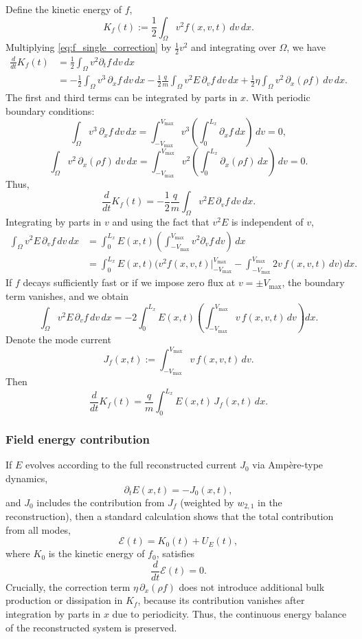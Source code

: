 \documentclass[11pt]{article}
\begin{document}
Define the kinetic energy of $f$,
\[
  K_f(t) := \frac12 \int_{\Omega} v^2 f(x,v,t)\,dv\,dx.
\]
Multiplying \eqref{eq:f_single_correction} by $\frac12 v^2$ and integrating
over $\Omega$, we have
\begin{align*}
  \frac{d}{dt} K_f(t)
  &= \frac12 \int_{\Omega} v^2 \partial_t f\,dv\,dx \\
  &= -\frac12 \int_{\Omega} v^3\,\partial_x f\,dv\,dx
     -\frac12 \frac{q}{m} \int_{\Omega} v^2 E\,\partial_v f\,dv\,dx
     +\frac12 \eta \int_{\Omega} v^2\,\partial_x(\rho f)\,dv\,dx.
\end{align*}
The first and third terms can be integrated by parts in $x$. With periodic
boundary conditions:
\[
  \int_{\Omega} v^3\,\partial_x f\,dv\,dx
  = \int_{-V_{\max}}^{V_{\max}} v^3 
    \left( \int_0^{L_x} \partial_x f\,dx \right)\,dv = 0,
\]
\[
  \int_{\Omega} v^2\,\partial_x(\rho f)\,dv\,dx
  = \int_{-V_{\max}}^{V_{\max}} v^2
    \left( \int_0^{L_x} \partial_x(\rho f)\,dx \right)\,dv = 0.
\]
Thus,
\[
  \frac{d}{dt} K_f(t)
  = -\frac12 \frac{q}{m} \int_{\Omega} v^2 E\,\partial_v f\,dv\,dx.
\]
Integrating by parts in $v$ and using the fact that $v^2 E$ is independent of
$v$,
\begin{align*}
  \int_{\Omega} v^2 E\,\partial_v f\,dv\,dx
  &= \int_0^{L_x} E(x,t)
     \left(\int_{-V_{\max}}^{V_{\max}} v^2 \partial_v f\,dv \right)\,dx \\
  &= \int_0^{L_x} E(x,t)
     \Big( v^2 f(x,v,t) \big|_{-V_{\max}}^{V_{\max}}
           - \int_{-V_{\max}}^{V_{\max}} 2v\,f(x,v,t)\,dv
     \Big)\,dx.
\end{align*}
If $f$ decays sufficiently fast or if we impose zero flux at $v=\pm V_{\max}$,
the boundary term vanishes, and we obtain
\[
  \int_{\Omega} v^2 E\,\partial_v f\,dv\,dx
  = -2 \int_0^{L_x} E(x,t)
                  \left(\int_{-V_{\max}}^{V_{\max}} v\,f(x,v,t)\,dv\right)dx.
\]
Denote the mode current
\[
  J_f(x,t) := \int_{-V_{\max}}^{V_{\max}} v\,f(x,v,t)\,dv.
\]
Then
\[
  \frac{d}{dt} K_f(t)
  = \frac{q}{m} \int_0^{L_x} E(x,t)\,J_f(x,t)\,dx.
\]

\subsubsection{Field energy contribution}

If $E$ evolves according to the full reconstructed current $J_0$ via
Amp\`ere-type dynamics,
\[
  \partial_t E(x,t) = - J_0(x,t),
\]
and $J_0$ includes the contribution from $J_f$ (weighted by $w_{2,1}$ in the
reconstruction), then a standard calculation shows that the total contribution
from all modes,
\[
  \mathcal{E}(t) = K_0(t) + U_E(t),
\]
where $K_0$ is the kinetic energy of $f_0$, satisfies
\[
  \frac{d}{dt} \mathcal{E}(t) = 0.
\]
Crucially, the correction term $\eta\,\partial_x(\rho f)$ does not introduce
additional bulk production or dissipation in $K_f$, because its contribution
vanishes after integration by parts in $x$ due to periodicity. Thus, the
continuous energy balance of the reconstructed system is preserved.
\end{document}
